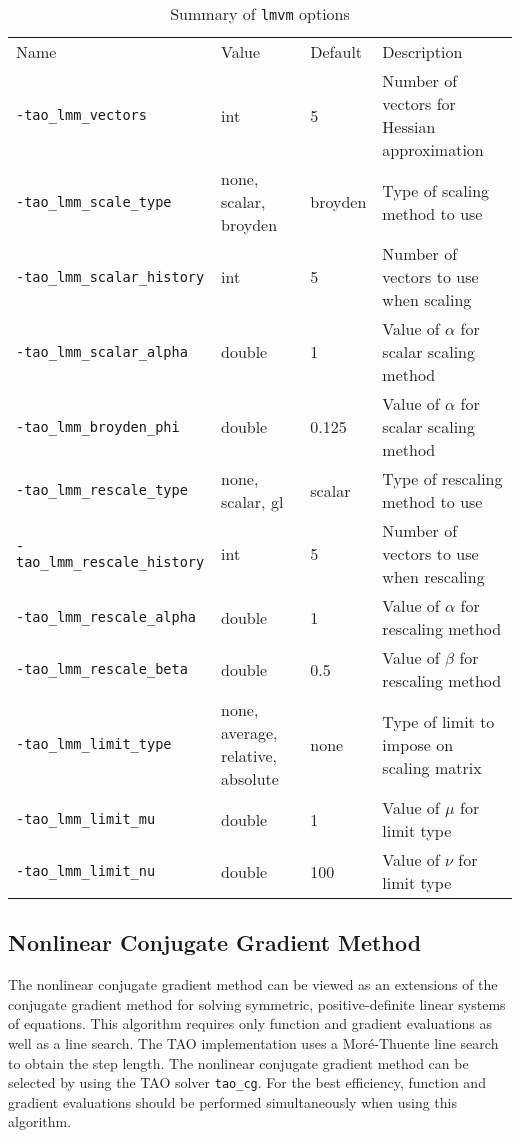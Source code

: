 \begin{table}[h]
\caption{Summary of {\tt lmvm} options}
\begin{tabular}{l|p{1.5in}|l|p{2.0in}}
Name & Value & Default & Description \\
{\tt -tao\_lmm\_vectors} & int & 5 & Number of vectors for Hessian approximation \\
{\tt -tao\_lmm\_scale\_type} & none, scalar, broyden & broyden & Type of scaling method to use \\
{\tt -tao\_lmm\_scalar\_history} & int & 5 & Number of vectors to use when scaling \\
{\tt -tao\_lmm\_scalar\_alpha} & double & 1 & Value of $\alpha$ for scalar scaling method \\
{\tt -tao\_lmm\_broyden\_phi} & double & 0.125 & Value of $\alpha$ for scalar scaling method \\
{\tt -tao\_lmm\_rescale\_type} & none, scalar, gl & scalar & Type of rescaling method to use \\
{\tt -tao\_lmm\_rescale\_history} & int & 5 & Number of vectors to use when rescaling \\
{\tt -tao\_lmm\_rescale\_alpha} & double & 1 & Value of $\alpha$ for rescaling method \\
{\tt -tao\_lmm\_rescale\_beta} & double & 0.5 & Value of $\beta$ for rescaling method \\
{\tt -tao\_lmm\_limit\_type} & none, average, relative, absolute & none & Type of limit to impose on scaling matrix \\
{\tt -tao\_lmm\_limit\_mu} & double & 1 & Value of $\mu$ for limit type\\
{\tt -tao\_lmm\_limit\_nu} & double & 100 & Value of $\nu$ for limit type\\
\end{tabular}
\end{table}

\subsection{Nonlinear Conjugate Gradient Method}

The nonlinear conjugate gradient method can be viewed as an extensions of the 
conjugate gradient method for solving symmetric, positive-definite linear 
systems of equations.  This algorithm requires only function and gradient 
evaluations as well as a line search.  The TAO implementation uses a 
Mor\'{e}-Thuente line search to obtain the step length.  The nonlinear 
conjugate gradient method can be selected by using the TAO solver 
{\tt tao\_cg}.  For the best efficiency, function and gradient evaluations 
should be performed simultaneously when using this algorithm.

